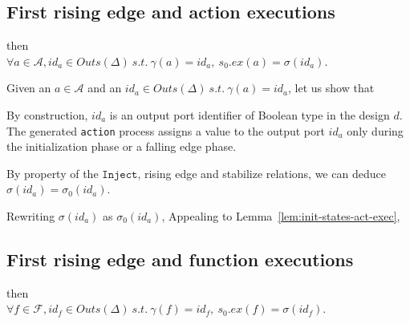 \documentclass[dvipsnames,12pt]{article}
\begin{document}
\subsection{First rising edge and action executions}
\label{sec:fst-re-actions-ex}

\begin{lemma}
  \label{lem:fst-re-equal-action-ex}
  \fstrehyps{} then\\
  $\forall{}a\in\mathcal{A},id_a\in{}Outs(\Delta)~s.t.~\gamma(a)=id_a,~s_0.ex(a)=\sigma(id_a)$.\\
\end{lemma}

\begin{niproof}
  Given an $a\in\mathcal{A}$ and an
  $id_a\in{}Outs(\Delta)~s.t.~\gamma(a)=id_a$, let us show that

  By construction, $id_a$ is an output port identifier of Boolean type
  in the \hvhdl{} design $d$. The generated \texttt{action} process
  assigns a value to the output port $id_a$ only during the
  initialization phase or a falling edge phase.

  \noindent{}By property of the $\mathtt{Inject}$, \hvhdl{}
  rising edge and stabilize relations, we can deduce
  $\sigma(id_a)=\sigma_0(id_a)$.
  
  Rewriting $\sigma(id_a)$ as $\sigma_0(id_a)$,
    Appealing to
  Lemma~\ref{lem:init-states-act-exec},
  
\end{niproof}

\subsection{First rising edge and function executions}
\label{sec:fst-re-fun-ex}

\begin{lemma}
  \label{lem:fst-re-equal-fun-ex}
  \fstrehyps{} then\\
  $\forall{}f\in\mathcal{F},id_f\in{}Outs(\Delta)~s.t.~\gamma(f)=id_f,~s_0.ex(f)=\sigma(id_f)$.
\end{lemma}
\end{document}

